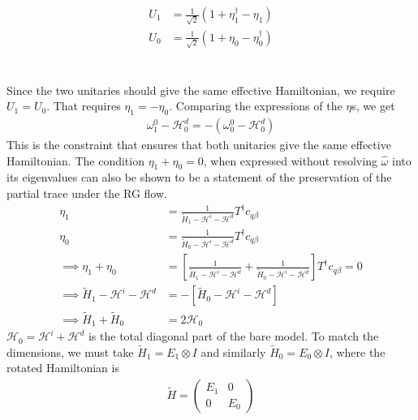 \begin{equation}\begin{aligned}
	U_1 &= \frac{1}{\sqrt 2}\left(1 + \eta_1^\dagger - \eta_1\right)\\
	U_0 &= \frac{1}{\sqrt 2}\left(1 + \eta_0 - \eta_0^\dagger\right)
\end{aligned}\end{equation}
\\\\Since the two unitaries should give the same effective Hamiltonian, we require \(U_1 = U_0\). That requires \(\eta_1 = -\eta_0\). Comparing the expressions of the \(\eta\)s, we get
\begin{equation}\begin{aligned}
	\omega_1^0 - \mathcal{H}^d_0 = -\left(\omega_0^0 - \mathcal{H}^d_0\right)
\end{aligned}\end{equation}
This is the constraint that ensures that both unitaries give the same effective Hamiltonian. The condition \(\eta_1 + \eta_0 = 0\), when expressed without resolving \(\hat \omega\) into its eigenvalues can also be shown to be a statement of the preservation of the partial trace under the RG flow.
\begin{equation}\begin{aligned}
	\label{trace}
\eta_1 &= \frac{1}{\tilde H_1 - \mathcal{H}^i - \mathcal{H}^d}T^\dagger c_{q\beta}\\
\eta_0 &= \frac{1}{\tilde H_0 - \mathcal{H}^i - \mathcal{H}^d}T^\dagger c_{q\beta}\\
\implies  \eta_1 + \eta_0 &= \left[\frac{1}{\tilde H_1 - \mathcal{H}^i - \mathcal{H}^d} + \frac{1}{\tilde H_0 - \mathcal{H}^i - \mathcal{H}^d}\right]T^\dagger c_{q\beta} = 0\\
\implies \tilde H_1 - \mathcal{H}^i - \mathcal{H}^d &= -\left[\tilde H_0 - \mathcal{H}^i - \mathcal{H}^d\right]\\
\implies \tilde H_1 + \tilde H_0 &= 2\mathcal{H}_0
\end{aligned}\end{equation}
\(\mathcal{H}_0 = \mathcal{H}^i + \mathcal{H}^d\) is the total diagonal part of the bare model. To match the dimensions, we must take \(\tilde H_1 = E_1 \otimes I\) and similarly \(\tilde H_0 = E_0 \otimes I\), where the rotated Hamiltonian is
\begin{equation}\begin{aligned}
\tilde H = \begin{pmatrix} E_1 & 0 \\ 0 & E_0\end{pmatrix}
\end{aligned}\end{equation}
